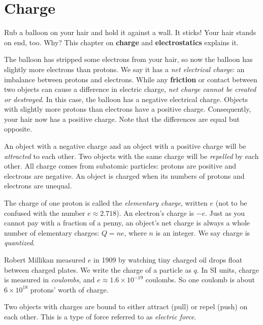\chapter{Charge}
Rub a balloon on your hair and hold it against a wall. It sticks! Your hair
stands on end, too. Why? This chapter on \textbf{charge} and
\textbf{electrostatics} explains it.

The balloon has stripped some electrons from your hair, so now the balloon
has slightly more electrons than protons. We say it has a \textit{net
electrical charge}: an imbalance between protons
and electrons. While any \textbf{friction} or contact between two objects can cause a difference in electric charge, \textit{net charge cannot be created or destroyed}.
In this case, the balloon has a negative electrical charge. Objects with
slightly more protons than electrons have a positive charge. Consequently, your
hair now has a positive charge. Note that the differences are equal but opposite.

An object with a negative charge and an object with a positive charge will be \emph{attracted}
to each other. Two objects with the same charge will be \emph{repelled}
by each other. All charge comes from subatomic particles: protons are positive and
electrons are negative. An object is charged when its numbers of protons
and electrons are unequal.

The charge of one proton is called the \textit{elementary
charge}, written $e$ (not to be
confused with the number $e \approx 2.718$). An electron's charge is $-e$.
Just as you cannot pay with a fraction of a penny, an object's net charge
is always a whole number of elementary charges: $Q = ne$, where $n$ is an
integer. We say charge is \emph{quantized}.

Robert Millikan measured $e$ in 1909 by watching tiny charged oil drops
float between charged plates. We write the charge of a particle as $q$.
In SI units, charge is measured in \emph{coulombs}, and
$e \approx 1.6 \times 10^{-19}$ coulombs. So one coulomb is about
$6 \times 10^{18}$ protons' worth of charge.

Two objects with charges are bound to either attract (pull) or repel (push) on
each other. This is a type of force referred to as \emph{electric force}.

